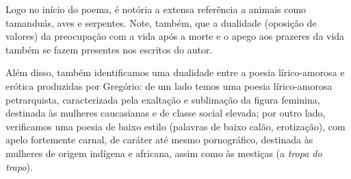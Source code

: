 Logo no início do poema, é notória a extensa referência a animais como tamanduás, aves e serpentes. Note, também, que a dualidade (oposição de valores) da preocupação com a vida após a morte e o apego aos prazeres da vida também se fazem presentes nos escritos do autor.

Além disso, também identificamos uma dualidade entre a poesia lírico-amorosa e erótica produzidas por Gregório: de um lado temos uma poesia lírico-amorosa petrarquista, caracterizada pela exaltação e sublimação da figura feminina, destinada às mulheres caucasianas e de classe social elevada; por outro lado, verificamos uma poesia de baixo estilo (palavras de baixo calão, erotização), com apelo fortemente carnal, de caráter até mesmo pornográfico, destinada às mulheres de origem indígena e africana, assim como às mestiças (a \textit{tropa do trapo}).

